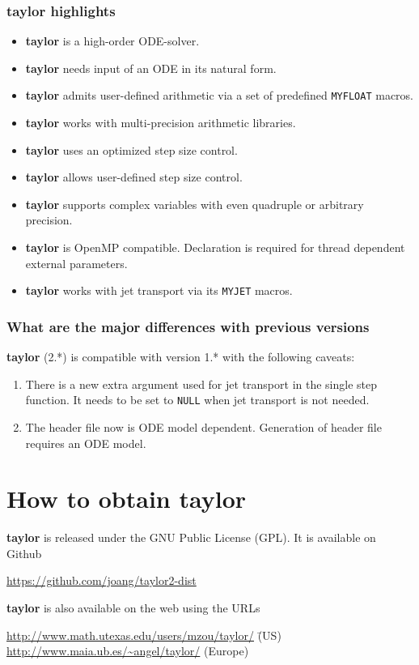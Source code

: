 \documentclass[10pt]{article}
\theoremstyle{remark}
\newcommand{\taylorname}{{\bf taylor}}
\newcommand{\myfloat}{{\tt MY\symbol{95}FLOAT}}
\newcommand{\myjet}{{\tt MY\symbol{95}JET}}
\begin{document}
\subsubsection*{\taylorname{} highlights}

\begin{itemize}
    \item \taylorname{} is a high-order ODE-solver.
    \item \taylorname{} needs input of an ODE in its natural form.
    \item \taylorname{} admits user-defined arithmetic via a set of
      predefined \myfloat{} macros.
    \item \taylorname{} works with multi-precision arithmetic libraries.
    \item \taylorname{} uses an optimized step size control.
    \item \taylorname{} allows user-defined step size control.
    \item \taylorname{} supports complex variables with even quadruple
      or arbitrary precision.
    \item \taylorname{} is OpenMP compatible. Declaration is required
      for thread dependent external parameters.
    \item \taylorname{} works with jet transport via its \myjet{}
      macros.
\end{itemize}

\subsubsection*{What are the major differences with previous versions}
\taylorname{} (2.*) is compatible with version 1.* with the following
caveats:
\begin{enumerate}
\renewcommand{\labelenumi}{\theenumi.)}
    \item There is a new extra argument used for jet transport in the
      single step function. It needs to be set to \verb+NULL+ when jet
      transport is not needed.
    \item The header file now is ODE model dependent. Generation of
      header file requires an ODE model.
\end{enumerate}

\section{How to obtain \taylorname{}} \label{sec:download}
\taylorname{} is released under the GNU Public License (GPL).  It is
available on Github
\begin{tabbing}
    \url{https://github.com/joang/taylor2-dist}
\end{tabbing}
\taylorname{} is also available on the web using the URLs
\begin{tabbing}
    \url{http://www.math.utexas.edu/users/mzou/taylor/}\hspace*{5mm} \= (US)\\
    \url{http://www.maia.ub.es/~angel/taylor/} \> (Europe)
\end{tabbing}
\end{document}
